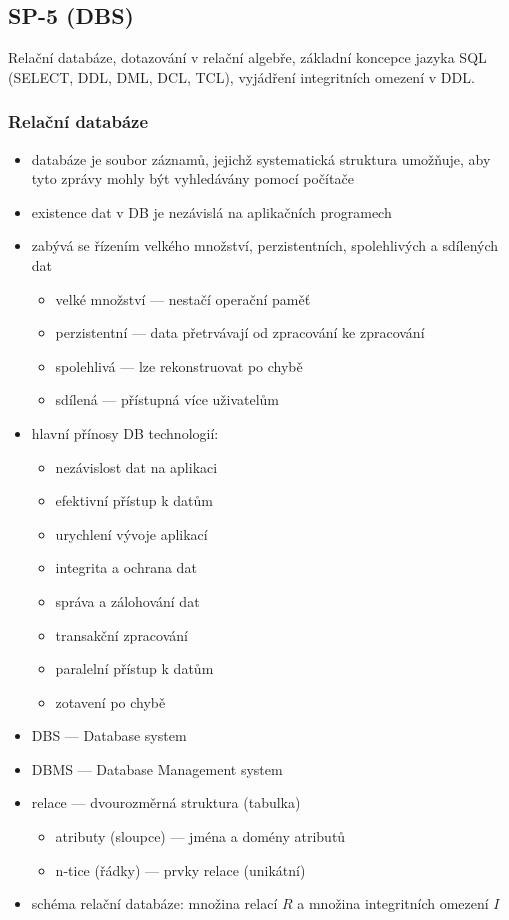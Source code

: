 \subsection{SP-5 (DBS)}
Relační databáze, dotazování v relační algebře, základní koncepce jazyka SQL (SELECT, DDL, DML, DCL, TCL), vyjádření integritních omezení v DDL.

\subsubsection*{Relační databáze}
\begin{itemize}
	\item databáze je soubor záznamů, jejichž systematická struktura umožňuje, aby tyto zprávy mohly být vyhledávány pomocí počítače
	\item existence dat v DB je nezávislá na aplikačních programech
	\item zabývá se řízením velkého množství, perzistentních, spolehlivých a sdílených dat
	\begin{itemize}
		\item velké množství --- nestačí operační paměť
		\item perzistentní --- data přetrvávají od zpracování ke zpracování
		\item spolehlivá --- lze rekonstruovat po chybě
		\item sdílená --- přístupná více uživatelům
	\end{itemize}
	\item hlavní přínosy DB technologií:
	\begin{itemize}
		\item nezávislost dat na aplikaci
		\item efektivní přístup k datům
		\item urychlení vývoje aplikací
		\item integrita a ochrana dat
		\item správa a zálohování dat
		\item transakční zpracování
		\item paralelní přístup k datům
		\item zotavení po chybě
	\end{itemize}
	\item DBS --- Database system
	\item DBMS --- Database Management system
	\item relace --- dvourozměrná struktura (tabulka)
	\begin{itemize}
		\item atributy (sloupce) --- jména a domény atributů
		\item n-tice (řádky) --- prvky relace (unikátní)
	\end{itemize}
	\item schéma relační databáze: množina relací $R$ a množina integritních omezení $I$
\end{itemize}

